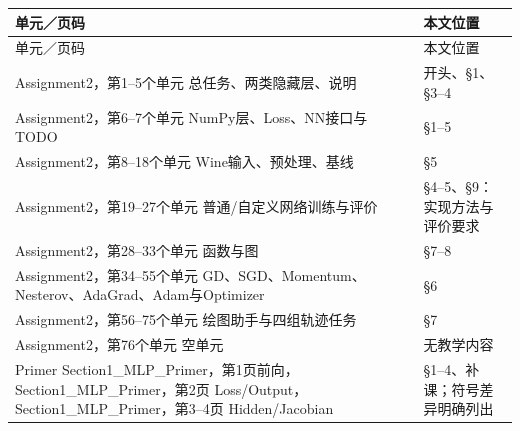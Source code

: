 \begingroup
\small\setlength{\tabcolsep}{3pt}
\renewcommand{\arraystretch}{1.22}
\begin{longtable}{@{}>{\raggedright\arraybackslash}p{}>{\raggedright\arraybackslash}p{}@{}}
\toprule
单元／页码 & 本文位置 \\
\midrule\endfirsthead
单元／页码 & 本文位置 \\
\midrule\endhead
\bottomrule\endfoot
Assignment2，第1–5个单元 总任务、两类隐藏层、说明 & 开头、§1、§3–4 \\
Assignment2，第6–7个单元 NumPy层、Loss、NN接口与TODO & §1–5 \\
Assignment2，第8–18个单元 Wine输入、预处理、基线 & §5 \\
Assignment2，第19–27个单元 普通/自定义网络训练与评价 & §4–5、§9：实现方法与评价要求 \\
Assignment2，第28–33个单元 函数与图 & §7–8 \\
Assignment2，第34–55个单元 GD、SGD、Momentum、Nesterov、AdaGrad、Adam与Optimizer & §6 \\
Assignment2，第56–75个单元 绘图助手与四组轨迹任务 & §7 \\
Assignment2，第76个单元 空单元 & 无教学内容 \\
Primer Section1\_MLP\_Primer，第1页前向，Section1\_MLP\_Primer，第2页 Loss/Output，Section1\_MLP\_Primer，第3–4页 Hidden/Jacobian & §1–4、补课；符号差异明确列出 \\
\end{longtable}
\endgroup

